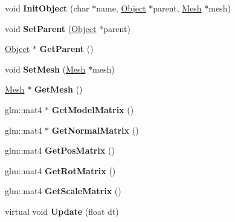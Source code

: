 \begin{DoxyCompactItemize}
\item 
\mbox{\label{class_object_ab37a94ec1146c22546445d4baaf55697}} 
void {\bfseries Init\+Object} (char $\ast$name, \hyperlink{class_object}{Object} $\ast$parent, \hyperlink{class_mesh}{Mesh} $\ast$mesh)
\item 
\mbox{\label{class_object_a344ba3716db86c373345265935280968}} 
void {\bfseries Set\+Parent} (\hyperlink{class_object}{Object} $\ast$parent)
\item 
\mbox{\label{class_object_a6f86d9e3b77d79cc3a6a4d57a5c9ed72}} 
\hyperlink{class_object}{Object} $\ast$ {\bfseries Get\+Parent} ()
\item 
\mbox{\label{class_object_a6be7369b2a3382f82ea8d3e61c061b59}} 
void {\bfseries Set\+Mesh} (\hyperlink{class_mesh}{Mesh} $\ast$mesh)
\item 
\mbox{\label{class_object_ac59efbef5ea2a39576d7a057eb5e11ac}} 
\hyperlink{class_mesh}{Mesh} $\ast$ {\bfseries Get\+Mesh} ()
\item 
\mbox{\label{class_object_a58e26d2cc568b514884336ed279dc00c}} 
glm\+::mat4 $\ast$ {\bfseries Get\+Model\+Matrix} ()
\item 
\mbox{\label{class_object_ae7ebb71e79aeb36213dd3e053a72b446}} 
glm\+::mat4 $\ast$ {\bfseries Get\+Normal\+Matrix} ()
\item 
\mbox{\label{class_object_aa26a8254ffe085f5f68c37f5b7f19f23}} 
glm\+::mat4 {\bfseries Get\+Pos\+Matrix} ()
\item 
\mbox{\label{class_object_a806ea3c855a382f8f6986760505ac808}} 
glm\+::mat4 {\bfseries Get\+Rot\+Matrix} ()
\item 
\mbox{\label{class_object_ac35d079dfc5a9fbab69fe6ab5d5e2696}} 
glm\+::mat4 {\bfseries Get\+Scale\+Matrix} ()
\item 
\mbox{\label{class_object_a03bd9ae689e9535934f46222644f44aa}} 
virtual void {\bfseries Update} (float dt)

\end{DoxyCompactItemize}
